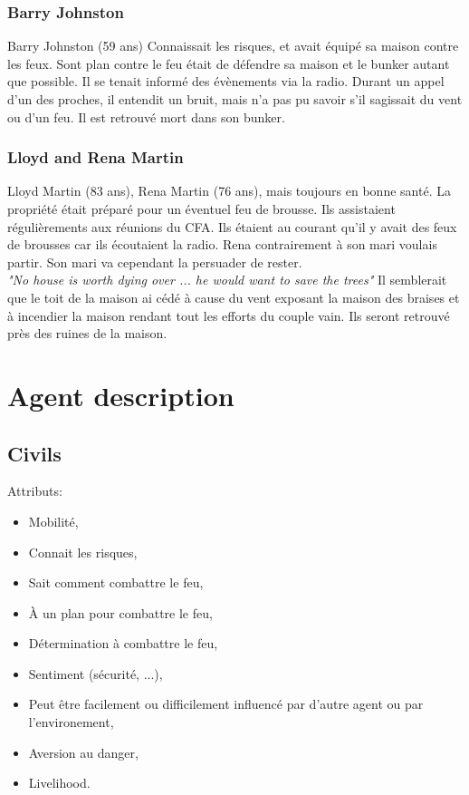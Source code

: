             \subsubsection{Barry Johnston}
                Barry Johnston (59 ans)
                Connaissait les risques, et avait équipé sa maison contre les feux.
                Sont plan contre le feu était de défendre sa maison et le bunker autant que possible.
                Il se tenait informé des évènements via la radio.
                Durant un appel d'un des proches, il entendit un bruit, mais n'a pas pu savoir s'il sagissait du vent ou d'un feu.
                Il est retrouvé mort dans son bunker.

            \subsubsection{Lloyd and Rena Martin}
                Lloyd Martin (83 ans), Rena Martin (76 ans), mais toujours en bonne santé.
                La propriété était préparé pour un éventuel feu de brousse. Ils assistaient régulièrements aux réunions du
                CFA.
                Ils étaient au courant qu'il y avait des feux de brousses car ils écoutaient la radio. Rena contrairement à
                son mari voulais partir. Son mari va cependant la persuader de rester.\\
                \textit{"No house is worth dying over ... he would want to save the trees"}
                Il semblerait que le toit de la maison ai cédé à cause du vent exposant la maison des braises et à incendier la maison
                rendant tout les efforts du couple vain.
                Ils seront retrouvé près des ruines de la maison.


    \section{Agent description}

        \subsection{Civils}

            Attributs:
            \begin{itemize}
                \item Mobilité,
                \item Connait les risques,
                \item Sait comment combattre le feu,
                \item À un plan pour combattre le feu,
                \item Détermination à combattre le feu,
                \item Sentiment (sécurité, ...),
                \item Peut être facilement ou difficilement influencé par d'autre agent ou par l'environement,
                \item Aversion au danger,
                \item Livelihood.
            \end{itemize}

